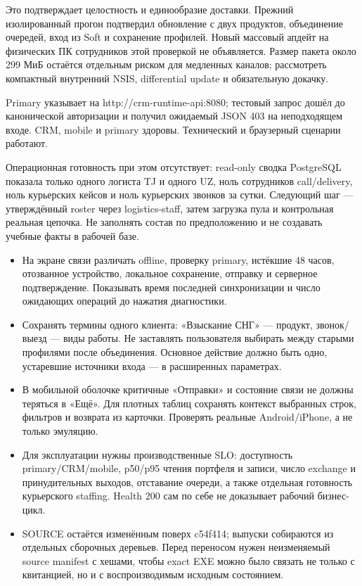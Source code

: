 \documentclass[12pt,a4paper]{article}
\newcommand{\subhead}[1]{\par\vspace{4pt}{\large\sffamily\bfseries\color{accent}#1\par}\nopagebreak}
\begin{document}
Это подтверждает целостность и единообразие доставки. Прежний изолированный прогон подтвердил обновление с двух продуктов, объединение очередей, вход из Soft и сохранение профилей. Новый массовый апдейт на физических ПК сотрудников этой проверкой не объявляется. Размер пакета около 299 МиБ остаётся отдельным риском для медленных каналов; рассмотреть компактный внутренний NSIS, differential update и обязательную докачку.\par
\subhead{Курьерский контур}
Primary указывает на {\small\ttfamily http:/\allowbreak{}/\allowbreak{}crm-\allowbreak{}runtime-\allowbreak{}api:8080}; тестовый запрос дошёл до канонической авторизации и получил ожидаемый JSON 403 на неподходящем входе. CRM, mobile и primary здоровы. Технический и браузерный сценарии работают.\par
Операционная готовность при этом отсутствует: read-only сводка PostgreSQL показала только одного логиста TJ и одного UZ, ноль сотрудников {\small\ttfamily call}/{\small\ttfamily delivery}, ноль курьерских кейсов и ноль курьерских звонков за сутки. Следующий шаг — утверждённый roster через {\small\ttfamily logistics-\allowbreak{}staff}, затем загрузка пула и контрольная реальная цепочка. Не заполнять состав по предположению и не создавать учебные факты в рабочей базе.\par
\subhead{Эксплуатация и UI/UX}
\begin{itemize}
\item На экране связи различать offline, проверку primary, истёкшие 48 часов, отозванное устройство, локальное сохранение, отправку и серверное подтверждение. Показывать время последней синхронизации и число ожидающих операций до нажатия диагностики.
\item Сохранять термины одного клиента: «Взыскание СНГ» — продукт, звонок/выезд — виды работы. Не заставлять пользователя выбирать между старыми профилями после объединения. Основное действие должно быть одно, устаревшие источники входа — в расширенных параметрах.
\item В мобильной оболочке критичные «Отправки» и состояние связи не должны теряться в «Ещё». Для плотных таблиц сохранять контекст выбранных строк, фильтров и возврата из карточки. Проверять реальные Android/iPhone, а не только эмуляцию.
\item Для эксплуатации нужны производственные SLO: доступность primary/CRM/mobile, p50/p95 чтения портфеля и записи, число exchange и принудительных выходов, отставание очереди, а также отдельная готовность курьерского staffing. Health 200 сам по себе не доказывает рабочий бизнес-цикл.
\item SOURCE остаётся изменённым поверх {\small\ttfamily c54f414}; выпуски собираются из отдельных сборочных деревьев. Перед переносом нужен неизменяемый source manifest с хешами, чтобы exact EXE можно было связать не только с квитанцией, но и с воспроизводимым исходным состоянием.
\end{itemize}
\end{document}
